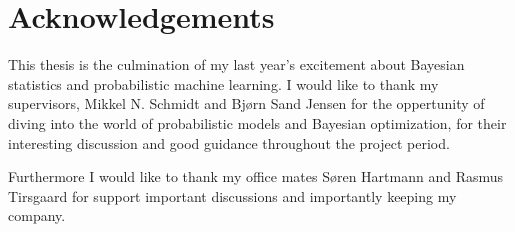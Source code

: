 \section*{Acknowledgements}
This thesis is the culmination of my last year's excitement about Bayesian statistics and
probabilistic machine learning. I would like to thank my supervisors, Mikkel N. Schmidt and Bjørn
Sand Jensen for the oppertunity of diving into the world of probabilistic models and Bayesian
optimization, for their interesting discussion and good guidance throughout the project period. 

Furthermore I would like to thank my office mates Søren Hartmann and Rasmus Tirsgaard for support important
discussions and importantly keeping my company. 








